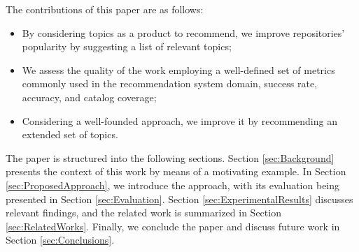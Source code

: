 
The contributions of this paper are as follows:
\begin{itemize}
	\item By considering \GH topics as a product to recommend, we improve 
	repositories' popularity by suggesting a list of relevant topics;
	\item We assess the quality of the work employing a well-defined set of 
	metrics commonly used in the recommendation system domain, \ie success rate, 
	accuracy, and catalog coverage;
	\item Considering a well-founded approach, we improve it by recommending an 
	extended set of topics.  
\end{itemize}

The paper is structured into the following sections. Section \ref{sec:Background} presents the 
context of this work by means of a motivating example. In Section 
\ref{sec:ProposedApproach}, we introduce the \TF approach, with its evaluation being 
presented in Section \ref{sec:Evaluation}. Section 
\ref{sec:ExperimentalResults} discusses relevant findings, and the related work is 
summarized in  Section \ref{sec:RelatedWorks}. Finally, we conclude the paper 
and discuss future work in Section \ref{sec:Conclusions}.
